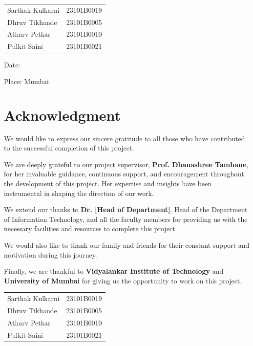 \documentclass[12pt,a4paper]{report}
\begin{document}
\vspace{2cm}

\noindent\begin{tabular}{@{}ll}
    Sarthak Kulkarni & 23101B0019 \\
    Dhruv Tikhande & 23101B0005 \\
    Atharv Petkar & 23101B0010 \\
    Pulkit Saini & 23101B0021 \\
\end{tabular}

\vspace{2cm}

\noindent Date: \underline{\hspace{3cm}}

\noindent Place: Mumbai

\chapter*{Acknowledgment}
\thispagestyle{empty}

We would like to express our sincere gratitude to all those who have contributed to the successful completion of this project.

We are deeply grateful to our project supervisor, \textbf{Prof. Dhanashree Tamhane}, for her invaluable guidance, continuous support, and encouragement throughout the development of this project. Her expertise and insights have been instrumental in shaping the direction of our work.

We extend our thanks to \textbf{Dr. [Head of Department]}, Head of the Department of Information Technology, and all the faculty members for providing us with the necessary facilities and resources to complete this project.

We would also like to thank our family and friends for their constant support and motivation during this journey.

Finally, we are thankful to \textbf{Vidyalankar Institute of Technology} and \textbf{University of Mumbai} for giving us the opportunity to work on this project.

\vspace{2cm}

\noindent\begin{tabular}{@{}ll}
    Sarthak Kulkarni & 23101B0019 \\
    Dhruv Tikhande & 23101B0005 \\
    Atharv Petkar & 23101B0010 \\
    Pulkit Saini & 23101B0021 \\
\end{tabular}
\end{document}
